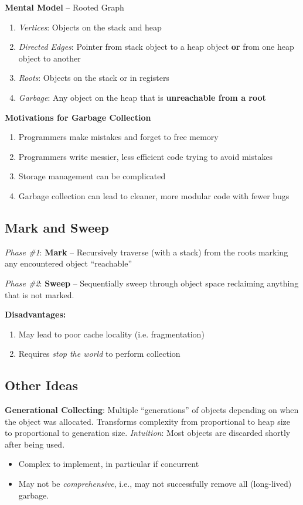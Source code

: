 \documentclass[10pt,twocolumn]{report}
\begin{document}
  \textbf{Mental Model} -- Rooted Graph
  \begin{enumerate}
    \item \textit{Vertices}: Objects on the stack and heap
    \item \textit{Directed Edges}: Pointer from stack object to a heap object \textbf{or} from one heap object to another
    \item \textit{Roots}: Objects on the stack or in registers
    \item \textit{Garbage}: Any object on the heap that is \textbf{unreachable from a root}
  \end{enumerate}

  \textbf{Motivations for Garbage Collection}
  \begin{enumerate}
    \item Programmers make mistakes and forget to free memory
    \item Programmers write messier, less efficient code trying to avoid mistakes
    \item Storage management can be complicated
    \item Garbage collection can lead to cleaner, more modular code with fewer bugs
  \end{enumerate}

\subsection*{Mark and Sweep}
  \textit{Phase \#1}: \textbf{Mark} -- Recursively traverse (with a stack) from the roots marking any encountered object ``reachable''
  
  \textit{Phase \#2}: \textbf{Sweep} -- Sequentially sweep through object space reclaiming anything that is not marked.
  
  \textbf{Disadvantages:}
  \begin{enumerate}
    \item May lead to poor cache locality (i.e. fragmentation)
    \item Requires \textit{stop the world} to perform collection
  \end{enumerate}
  
\subsection*{Other Ideas}

  \textbf{Generational Collecting}: Multiple ``generations'' of objects depending on when the object was allocated. Transforms complexity from proportional to heap size to proportional to generation size. \textit{Intuition}: Most objects are discarded shortly after being used.
  \begin{itemize}
    \item Complex to implement, in particular if concurrent
    \item May not be \textit{comprehensive}, i.e., may not successfully remove all (long-lived) garbage.
  \end{itemize}
\end{document}
